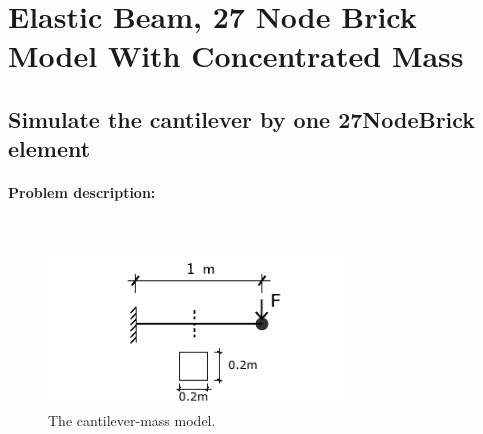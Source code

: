 \documentclass[fleqn,11pt]{article}
\begin{document}

\newpage
\section{Elastic Beam, 27 Node Brick Model With Concentrated Mass} 
\subsection{Simulate the cantilever by one 27NodeBrick element} 
\paragraph{Problem description:} ~

% 
% 
% 

\begin{figure}[!htb]
  \centering
  \includegraphics[width=8cm]{../Figure-files/_Chapter_Appendix_Illustrative_Examples/cantilever-mass.pdf}
  \caption{The cantilever-mass model.}
\end{figure}
\end{document}
